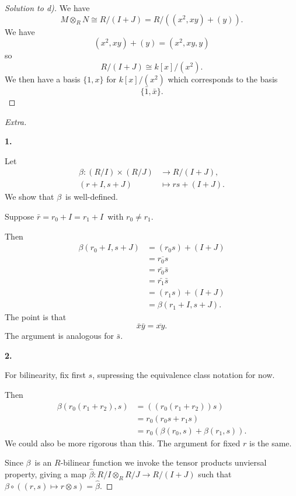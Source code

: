 \documentclass[11pt]{article}
\begin{document}
\begin{proof}[Solution to d)]
    We have 
    \[
        M \otimes_R N \cong R/(I + J) 
        = R/((x^2,xy) + (y)). 
    \]
    We have 
    \[
        (x^2,xy) + (y) = (x^2,xy,y) 
    \]
    so 
    \[
        R/(I + J) \cong k[x]/(x^2). 
    \]
    We then have a basis $\{1,x\}$ for $k[x]/(x^2)$ which corresponds 
    to the basis 
    \[
        \{\bar 1, \bar x\}. 
    \]
\end{proof}
\begin{proof}[Extra]
    \medskip 
    \ 

    \textbf{1.}

    Let 
    \[
        \begin{aligned}
            \beta:(R/I)\times(R/J)&\longrightarrow R/(I+J),\\
            (r+I,s+J)&\longmapsto rs+(I+J).
        \end{aligned}
    \]
    We show that $\beta$ is well-defined. 

    Suppose $\bar r = r_0 + I = r_1 + I$ with 
    $r_0 \neq r_1$. 

    Then 
    \begin{align*}
        \beta(r_0 + I, s + J) 
        &= (r_0s) + (I + J) \\ 
        &= \overline{r_0s} \\ 
        &= \bar{r_0} \bar s \\ 
        &= \bar{r_1} \bar s \\ 
        &= (r_1s) + (I + J) \\ 
        &= \beta(r_1 + I, s + J). 
    \end{align*}
    The point is that 
    \[
        \bar x \bar y = \overline{xy}. 
    \]
    The argument is analogous for $\bar s$. 

    \textbf{2.}

    For bilinearity, fix first $s$, supressing the 
    equivalence class notation for now.

    Then 
    \begin{align*}
        \beta(r_0(r_1+r_2), s) 
        &= ((r_0(r_1+r_2))s) \\ 
        &= r_0(r_0s + r_1s) \\ 
        &= r_0(\beta(r_0,s) + \beta(r_1,s)).  
    \end{align*}
    We could also be more rigorous than this.
    The argument for fixed $r$ is the same. 

    Since $\beta$ is an $R$-bilinear function we invoke the 
    tensor products unviersal property, giving 
    a map $\widehat \beta : R/I \otimes_R R/J \to R/(I + J)$ 
    such that $\beta \circ ((r,s) \mapsto r \otimes s) 
    = \widehat \beta$. 
\end{proof}
\end{document}
